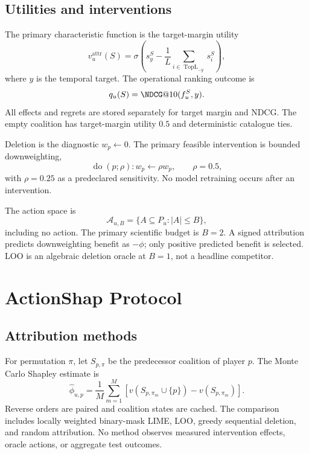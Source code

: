 \documentclass[pdflatex,sn-basic,Numbered]{sn-jnl}
\begin{document}
\subsection{Utilities and interventions}
The primary characteristic function is the target-margin utility
\begin{equation}
v_u^{\mathrm{attr}}(S)=\sigma\left(s_y^S-\frac{1}{L}\sum_{i\in\operatorname{TopL}_{-y}}s_i^S\right),
\end{equation}
where $y$ is the temporal target. The operational ranking outcome is
\begin{equation}
q_u(S)=\NDCG@10(f_u^S,y).
\end{equation}
All effects and regrets are stored separately for target margin and NDCG. The empty coalition has target-margin utility $0.5$ and deterministic catalogue ties.

Deletion is the diagnostic $w_p\leftarrow0$. The primary feasible intervention is bounded downweighting,
\begin{equation}
\operatorname{do}(p;\rho):w_p\leftarrow\rho w_p,\qquad \rho=0.5,
\end{equation}
with $\rho=0.25$ as a predeclared sensitivity. No model retraining occurs after an intervention.

The action space is
\begin{equation}
\mathcal A_{u,B}=\{A\subseteq P_u:|A|\le B\},
\end{equation}
including no action. The primary scientific budget is $B=2$. A signed attribution predicts downweighting benefit as $-\phi$; only positive predicted benefit is selected. LOO is an algebraic deletion oracle at $B=1$, not a headline competitor.

\section{ActionShap Protocol}
\subsection{Attribution methods}
For permutation $\pi$, let $S_{p,\pi}$ be the predecessor coalition of player $p$. The Monte Carlo Shapley estimate is
\begin{equation}
\widehat\phi_{u,p}=\frac{1}{M}\sum_{m=1}^{M}\left[v(S_{p,\pi_m}\cup\{p\})-v(S_{p,\pi_m})\right].
\end{equation}
Reverse orders are paired and coalition states are cached. The comparison includes locally weighted binary-mask LIME, LOO, greedy sequential deletion, and random attribution. No method observes measured intervention effects, oracle actions, or aggregate test outcomes.
\end{document}
